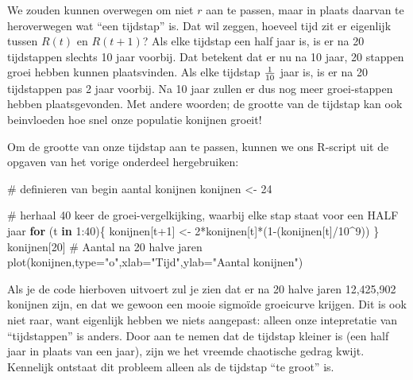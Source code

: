 \documentclass[
  a4paper,
]{scrbook}
\newenvironment{Shaded}{\begin{snugshade}}{\end{snugshade}}
\newcommand{\AttributeTok}[1]{\textcolor[rgb]{0.40,0.45,0.13}{#1}}
\newcommand{\CommentTok}[1]{\textcolor[rgb]{0.37,0.37,0.37}{#1}}
\newcommand{\ControlFlowTok}[1]{\textcolor[rgb]{0.00,0.23,0.31}{\textbf{#1}}}
\newcommand{\DecValTok}[1]{\textcolor[rgb]{0.68,0.00,0.00}{#1}}
\newcommand{\FunctionTok}[1]{\textcolor[rgb]{0.28,0.35,0.67}{#1}}
\newcommand{\NormalTok}[1]{\textcolor[rgb]{0.00,0.23,0.31}{#1}}
\newcommand{\OtherTok}[1]{\textcolor[rgb]{0.00,0.23,0.31}{#1}}
\newcommand{\SpecialCharTok}[1]{\textcolor[rgb]{0.37,0.37,0.37}{#1}}
\newcommand{\StringTok}[1]{\textcolor[rgb]{0.13,0.47,0.30}{#1}}
\theoremstyle{definition}
\theoremstyle{remark}
\begin{document}
We zouden kunnen overwegen om niet \(r\) aan te passen, maar in plaats
daarvan te heroverwegen wat ``een tijdstap'' is. Dat wil zeggen, hoeveel
tijd zit er eigenlijk tussen \(R(t)\) en \(R(t+1)\)? Als elke tijdstap
een half jaar is, is er na 20 tijdstappen slechts 10 jaar voorbij. Dat
betekent dat er nu na 10 jaar, 20 stappen groei hebben kunnen
plaatsvinden. Als elke tijdstap \(1 \over 10\) jaar is, is er na 20
tijdstappen pas 2 jaar voorbij. Na 10 jaar zullen er dus nog meer
groei-stappen hebben plaatsgevonden. Met andere woorden; de grootte van
de tijdstap kan ook beinvloeden hoe snel onze populatie konijnen groeit!

Om de grootte van onze tijdstap aan te passen, kunnen we ons R-script
uit de opgaven van het vorige onderdeel hergebruiken:

\begin{Shaded}
\begin{Highlighting}[]
\CommentTok{\# definieren van begin aantal konijnen}
\NormalTok{konijnen }\OtherTok{\textless{}{-}} \DecValTok{24}

\CommentTok{\# herhaal 40 keer de groei{-}vergelkijking, waarbij elke stap staat voor een HALF jaar}
\ControlFlowTok{for}\NormalTok{ (t }\ControlFlowTok{in} \DecValTok{1}\SpecialCharTok{:}\DecValTok{40}\NormalTok{)\{}
\NormalTok{  konijnen[t}\SpecialCharTok{+}\DecValTok{1}\NormalTok{] }\OtherTok{\textless{}{-}} \DecValTok{2}\SpecialCharTok{*}\NormalTok{konijnen[t]}\SpecialCharTok{*}\NormalTok{(}\DecValTok{1}\SpecialCharTok{{-}}\NormalTok{(konijnen[t]}\SpecialCharTok{/}\DecValTok{10}\SpecialCharTok{\^{}}\DecValTok{9}\NormalTok{))}
\NormalTok{\}}
\NormalTok{konijnen[}\DecValTok{20}\NormalTok{] }\CommentTok{\# Aantal na 20 halve jaren}
\FunctionTok{plot}\NormalTok{(konijnen,}\AttributeTok{type=}\StringTok{"o"}\NormalTok{,}\AttributeTok{xlab=}\StringTok{"Tijd"}\NormalTok{,}\AttributeTok{ylab=}\StringTok{"Aantal konijnen"}\NormalTok{)}
\end{Highlighting}
\end{Shaded}

Als je de code hierboven uitvoert zul je zien dat er na 20 halve jaren
12,425,902 konijnen zijn, en dat we gewoon een mooie sigmoïde groeicurve
krijgen. Dit is ook niet raar, want eigenlijk hebben we niets aangepast:
alleen onze intepretatie van ``tijdstappen'' is anders. Door aan te
nemen dat de tijdstap kleiner is (een half jaar in plaats van een jaar),
zijn we het vreemde chaotische gedrag kwijt. Kennelijk ontstaat dit
probleem alleen als de tijdstap ``te groot'' is.
\end{document}
